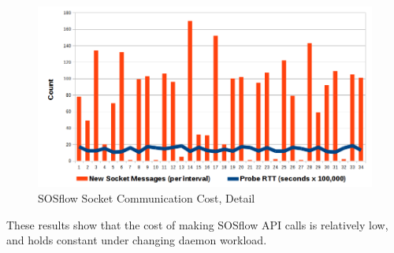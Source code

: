\begin{figure}[h]
\centering
\includegraphics[width=\columnwidth]{images/icebox_api_cost_zoom.png}
\caption{SOSflow Socket Communication Cost, Detail}
\label{sock_cost_detail}
\end{figure}
%
\par
%
These results show that the cost of making SOSflow API calls is
relatively low, and holds constant under changing daemon workload.
%
%





